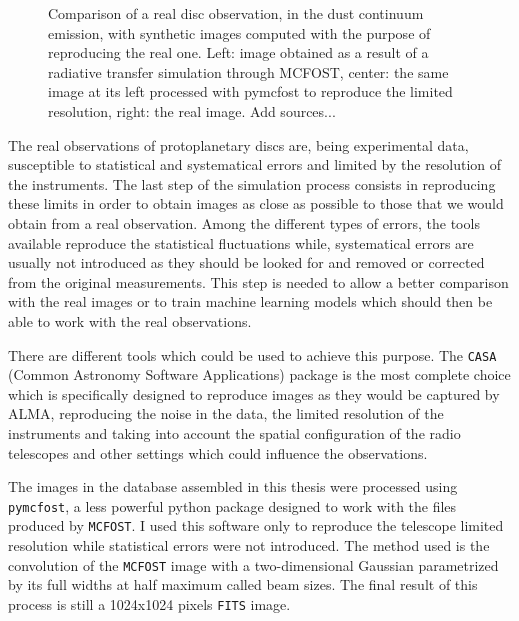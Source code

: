 \documentclass[a4paper,10pt]{report}
\begin{document}
\begin{figure}
    \begin{center}
        
    \end{center}
    \caption{Comparison of a real disc observation, in the dust continuum emission,
    with synthetic images computed with the purpose of reproducing the real one.
    Left: image obtained as a result of a radiative transfer simulation through MCFOST,
    center: the same image at its left processed with pymcfost to reproduce the limited
    resolution, right: the real image. Add sources...}
\end{figure}

The real observations of protoplanetary discs are, being experimental data, susceptible 
to statistical and systematical errors and limited by the resolution of the instruments.
The last step of the simulation process consists in reproducing these limits in order
to obtain images as close as possible to those that we would obtain from a real observation.
Among the different types of errors, the tools available reproduce the
statistical fluctuations while, systematical errors are usually not introduced as they should be 
looked for and removed or corrected from the original measurements.
This step is needed to allow a better comparison with the real images or to train machine learning 
models which should then be able to work with the real observations.

There are different tools which could be used to achieve this purpose.
The \lstinline{CASA} (Common Astronomy Software Applications) package is the most complete choice 
which is specifically designed to reproduce images as they would be captured by ALMA, reproducing the noise in the data,
the limited resolution of the instruments and taking into account the spatial configuration of the radio telescopes
and other settings which could influence the observations.

The images in the database assembled in this thesis were processed using \lstinline{pymcfost}, a less powerful 
python package designed to work with the files produced by \lstinline{MCFOST}.
I used this software only to reproduce the telescope limited resolution while statistical errors were not introduced.
The method used is the convolution of the \lstinline{MCFOST} image with a two-dimensional Gaussian parametrized 
by its full widths at half maximum called beam sizes.
The final result of this process is still a 1024x1024 pixels \lstinline{FITS} image.
\end{document}
